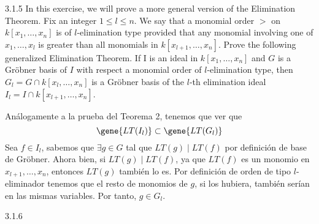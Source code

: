 \documentclass[twoside]{article}
\begin{document}
\begin{ejercicio}{3.1.5}
In this exercise, we will prove a more general version of the Elimination Theorem. Fix an integer $1\leq l \leq n$. We say that a monomial order $>$ on $k[x_1,\dotsc, x_n]$ is of $l$-elimination type provided that any monomial involving one of $x_1,\dotsc, x_l$ is greater than all monomials in $k[x_{l+1}, \dotsc, x_n]$. Prove the following generalized Elimination Theorem. If I is an ideal in $k[x_1,\dotsc, x_n]$ and $G$ is a  Gröbner basis of $I$ with respect a monomial order of $l$-elimination type, then $G_l = G\cap k[x_l,\dotsc, x_n]$ is a Gröbner basis of the $l$-th elimination ideal $I_l = I\cap k[x_{l+1},\dotsc, x_n]$.
\end{ejercicio}
\begin{solucion}
Análogamente a la prueba del Teorema 2, tenemos que ver que $$\gene{LT(I_l)}\subset \gene{LT(G_l)}$$
Sea $f\in I_l$, sabemos que $\exists g \in G$ tal que $LT(g)\mid LT(f)$ por definición de base de Gröbner. Ahora bien, si $LT(g)\mid LT(f)$, ya que $LT(f)$ es un monomio en $x_{l+1},\dotsc,x_n$, entonces $LT(g)$ también lo es. Por definición de  orden de tipo $l$-eliminador tenemos que el resto de monomios de $g$, si los hubiera, también serían en las mismas variables. Por tanto, $g\in G_l$.
\end{solucion}


\newpage

\begin{ejercicio}{3.1.6}

\end{ejercicio}
\begin{solucion}
\begin{enumerate}[a.]
\end{enumerate}
\end{solucion}


\newpage
\end{document}
